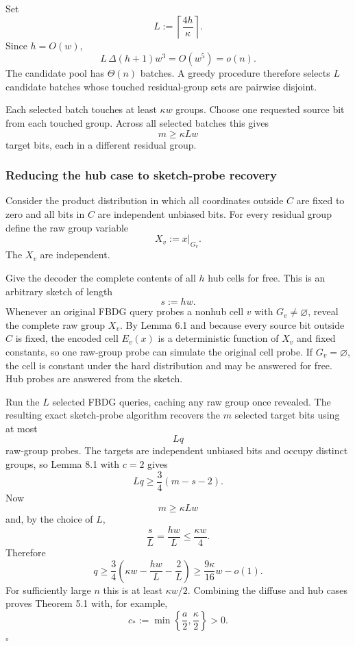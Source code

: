 \documentclass[
]{article}
\begin{document}
Set \[
L:=\left\lceil\frac{4h}{\kappa}\right\rceil.
\] Since \(h=O(w)\), \[
L\,\Delta(h+1)w^3=O(w^5)=o(n).
\] The candidate pool has \(\Theta(n)\) batches. A greedy procedure
therefore selects \(L\) candidate batches whose touched residual-group
sets are pairwise disjoint.

Each selected batch touches at least \(\kappa w\) groups. Choose one
requested source bit from each touched group. Across all selected
batches this gives \[
m\ge\kappa Lw
\] target bits, each in a different residual group.

\hypertarget{reducing-the-hub-case-to-sketch-probe-recovery}{%
\subsubsection{Reducing the hub case to sketch-probe
recovery}\label{reducing-the-hub-case-to-sketch-probe-recovery}}

Consider the product distribution in which all coordinates outside \(C\)
are fixed to zero and all bits in \(C\) are independent unbiased bits.
For every residual group define the raw group variable \[
X_v:=x|_{G_v}.
\] The \(X_v\) are independent.

Give the decoder the complete contents of all \(h\) hub cells for free.
This is an arbitrary sketch of length \[
s:=hw.
\] Whenever an original FBDG query probes a nonhub cell \(v\) with
\(G_v\ne\varnothing\), reveal the complete raw group \(X_v\). By Lemma
6.1 and because every source bit outside \(C\) is fixed, the encoded
cell \(E_v(x)\) is a deterministic function of \(X_v\) and fixed
constants, so one raw-group probe can simulate the original cell probe.
If \(G_v=\varnothing\), the cell is constant under the hard distribution
and may be answered for free. Hub probes are answered from the sketch.

Run the \(L\) selected FBDG queries, caching any raw group once
revealed. The resulting exact sketch-probe algorithm recovers the \(m\)
selected target bits using at most \[
Lq
\] raw-group probes. The targets are independent unbiased bits and
occupy distinct groups, so Lemma 8.1 with \(c=2\) gives \[
Lq
\ge
\frac34(m-s-2).
\] Now \[
m\ge\kappa Lw
\] and, by the choice of \(L\), \[
\frac{s}{L}
=
\frac{hw}{L}
\le
\frac{\kappa w}{4}.
\] Therefore \[
q
\ge
\frac34\left(\kappa w-\frac{hw}{L}-\frac2L\right)
\ge
\frac{9\kappa}{16}w-o(1).
\] For sufficiently large \(n\) this is at least \(\kappa w/2\).
Combining the diffuse and hub cases proves Theorem 5.1 with, for
example, \[
c_*:=\min\left\{\frac a2,\frac\kappa2\right\}>0.
\] \(\square\)
\end{document}
